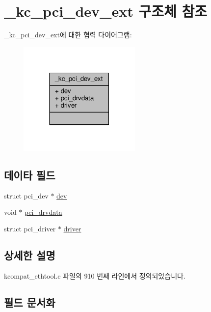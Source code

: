 \hypertarget{struct__kc__pci__dev__ext}{}\section{\+\_\+kc\+\_\+pci\+\_\+dev\+\_\+ext 구조체 참조}
\label{struct__kc__pci__dev__ext}


\+\_\+kc\+\_\+pci\+\_\+dev\+\_\+ext에 대한 협력 다이어그램\+:
\nopagebreak
\begin{figure}[H]
\begin{center}
\leavevmode
\includegraphics[width=170pt]{struct__kc__pci__dev__ext__coll__graph}
\end{center}
\end{figure}
\subsection*{데이타 필드}
\begin{DoxyCompactItemize}
\item 
struct pci\+\_\+dev $\ast$ \hyperlink{struct__kc__pci__dev__ext_aeb91c60cf706205b37cdd63dc6040761}{dev}
\item 
void $\ast$ \hyperlink{struct__kc__pci__dev__ext_a1612d616f91a828470e89832c172a6ff}{pci\+\_\+drvdata}
\item 
struct pci\+\_\+driver $\ast$ \hyperlink{struct__kc__pci__dev__ext_a93401bc2e859d98a2ad917c66dfbb23e}{driver}
\end{DoxyCompactItemize}


\subsection{상세한 설명}


kcompat\+\_\+ethtool.\+c 파일의 910 번째 라인에서 정의되었습니다.



\subsection{필드 문서화}
